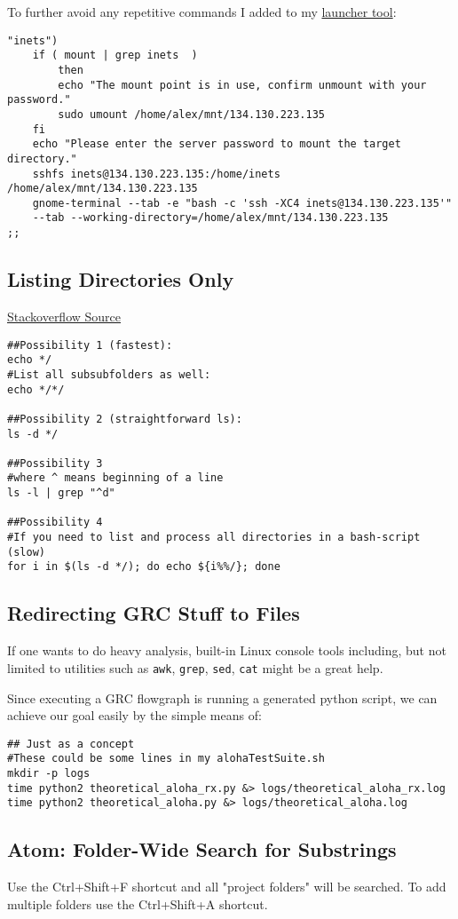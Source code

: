 \documentclass{article}
\begin{document}
To further avoid any repetitive commands I added to my \href{http://alexander-pastor.de/convenient-linux-game-launcher/}{launcher tool}:

\begin{verbatim}
"inets")
	if ( mount | grep inets  )
		then
		echo "The mount point is in use, confirm unmount with your password."
		sudo umount /home/alex/mnt/134.130.223.135
	fi
	echo "Please enter the server password to mount the target directory."
	sshfs inets@134.130.223.135:/home/inets /home/alex/mnt/134.130.223.135
	gnome-terminal --tab -e "bash -c 'ssh -XC4 inets@134.130.223.135'" 
	--tab --working-directory=/home/alex/mnt/134.130.223.135
;;
\end{verbatim}

\subsection{Listing Directories Only}

\href{https://stackoverflow.com/questions/14352290/listing-only-directories-using-ls-in-bash-an-examination}{Stackoverflow Source}

\begin{verbatim}
##Possibility 1 (fastest):
echo */
#List all subsubfolders as well:
echo */*/

##Possibility 2 (straightforward ls):
ls -d */

##Possibility 3
#where ^ means beginning of a line
ls -l | grep "^d"

##Possibility 4
#If you need to list and process all directories in a bash-script (slow)
for i in $(ls -d */); do echo ${i%%/}; done
\end{verbatim}

\subsection{Redirecting GRC Stuff to Files}
If one wants to do heavy analysis, built-in Linux console tools including, but not limited to utilities such as \verb|awk|, \verb|grep|, \verb|sed|, \verb|cat| might be a great help.

Since executing a GRC flowgraph is running a generated python script, we can achieve our goal easily by the simple means of:

\begin{verbatim}
## Just as a concept
#These could be some lines in my alohaTestSuite.sh
mkdir -p logs
time python2 theoretical_aloha_rx.py &> logs/theoretical_aloha_rx.log
time python2 theoretical_aloha.py &> logs/theoretical_aloha.log
\end{verbatim}

\subsection{Atom: Folder-Wide Search for Substrings}
Use the Ctrl+Shift+F shortcut and all "project folders" will be searched. To add multiple folders use the Ctrl+Shift+A shortcut.
\end{document}
